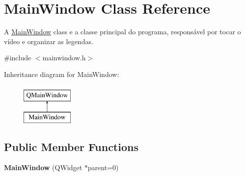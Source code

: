 \hypertarget{classMainWindow}{}\section{Main\+Window Class Reference}
\label{classMainWindow}


A \hyperlink{classMainWindow}{Main\+Window} class e a classe principal do programa, responsável por tocar o vídeo e organizar as legendas.  




{\ttfamily \#include $<$mainwindow.\+h$>$}

Inheritance diagram for Main\+Window\+:\begin{figure}[H]
\begin{center}
\leavevmode
\includegraphics[height=2.000000cm]{classMainWindow}
\end{center}
\end{figure}
\subsection*{Public Member Functions}
\begin{DoxyCompactItemize}
\item 
\hypertarget{classMainWindow_a8b244be8b7b7db1b08de2a2acb9409db}{}{\bfseries Main\+Window} (Q\+Widget $\ast$parent=0)\label{classMainWindow_a8b244be8b7b7db1b08de2a2acb9409db}

\end{DoxyCompactItemize}
